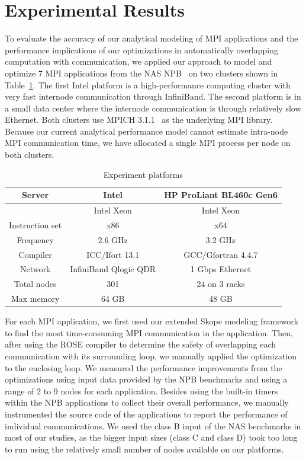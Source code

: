 \section{Experimental Results}
\label{sec-exp}

To evaluate the accuracy of our analytical modeling of MPI applications and
the performance implications of our optimizations in automatically
overlapping computation with communication, we applied our approach
to model and optimize 7 MPI applications from the NAS NPB~\cite{npb}
on two clusters shown in Table~\ref{tab:hw}.  The first Intel
platform is a high-performance computing cluster with very fast
internode communication through InfiniBand.  The second platform is in
a small data center where the internode communication is through
relatively slow Ethernet.  Both clusters use MPICH 3.1.1~\cite{mpich2}
as the underlying MPI library.  Because our current analytical
performance model cannot estimate intra-node MPI communication time, we
have allocated a single MPI process per node on both clusters.

\begin{table}
\caption{Experiment platforms}
\begin{center}
\begin{tabular}{c|c c}
\hline
Server & Intel & HP ProLiant BL460c Gen6 \\
\hline
          &  Intel Xeon & Intel Xeon \\
Instruction set  &  x86 & x64 \\
Frequency &  2.6 GHz & 3.2 GHz \\
Compiler  &  ICC/Ifort 13.1 & GCC/Gfortran 4.4.7 \\
Network   &  InfiniBand Qlogic QDR & 1 Gbps Ethernet \\
Total nodes &  301 & 24 on 3 racks\\
Max memory &  64 GB & 48 GB \\
\hline
\hline
\end{tabular}
\end{center}
\label{tab:hw}
\end{table}

For each MPI application, we first used our extended Skope
modeling framework to find the most time-consuming MPI communication
in the application.  Then, after using the ROSE compiler to determine the safety of 
overlapping each communication with its surrounding loop, we manually applied the 
optimization to the enclosing loop.  We measured the
performance improvements from the optimizations using input data
provided by the NPB benchmarks and using a range of 2 to 9 nodes for
each application.  Besides using the built-in timers within the NPB
applications to collect their overall performance, we manually
instrumented the source code of the applications to report the
performance of individual communications. We used the class B input of the NAS
benchmarks in most of our studies, as the bigger input sizes (class C and class D) 
took too long to run using the relatively small number of nodes available on our platforms. 

